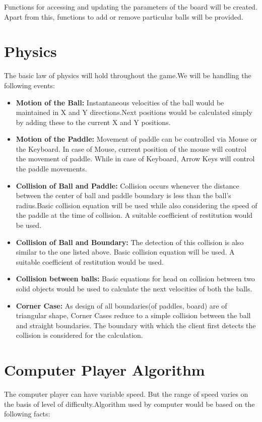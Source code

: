 \documentclass{article}
\begin{document}
Functions for accessing and updating the parameters of the board will be created. Apart from this, functions to add or remove particular balls will be provided.

			\section{Physics} 
			\par\noindent The basic law of physics will hold throughout the game.We will be handling the following events:
			\begin{itemize}
			\item \textbf{Motion of the Ball:} Instantaneous velocities of the ball would be maintained in X and Y directions.Next positions would be calculated simply by adding these to the current X and Y positions.

			\item \textbf{Motion of the Paddle:} Movement of paddle can be controlled via Mouse or the Keyboard. In case of Mouse, current position of the mouse will control the movement of paddle. While in case of Keyboard, Arrow Keys will control the paddle movements.
			\item \textbf{Collision of Ball and Paddle:} Collision occurs whenever the distance between the center of ball and paddle boundary is less than the ball's radius.Basic collision equation will be used while also considering the speed of the paddle at the time of collision. A suitable coefficient of restitution would be used.
			\item \textbf{Collision of Ball and Boundary:} The detection of this collision is also similar to the one listed above. Basic collision equation will be used. A suitable coefficient of restitution would be used.
			\item \textbf{Collision between balls:} Basic equations for head on collision between two solid objects would be used to calculate the next velocities of both the balls.
			\item \textbf{Corner Case:} As design of all boundaries(of paddles, board) are of triangular shape, Corner Cases reduce to a simple collision between the ball and straight boundaries. The boundary with which the client first detects the collision is considered for the calculation.
			\end{itemize}
			

			\section{Computer Player Algorithm}
			\par\noindent The computer player can have variable speed. But the range of speed varies on the basis of level of difficulty.Algorithm used by computer would be based on the following facts:
\end{document}
